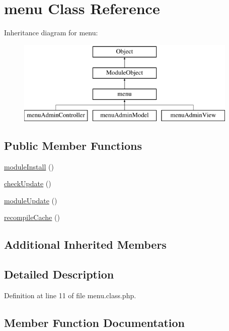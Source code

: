 \hypertarget{classmenu}{}\section{menu Class Reference}
\label{classmenu}
Inheritance diagram for menu\+:\begin{figure}[H]
\begin{center}
\leavevmode
\includegraphics[height=4.000000cm]{classmenu}
\end{center}
\end{figure}
\subsection*{Public Member Functions}
\begin{DoxyCompactItemize}
\item 
\hyperlink{classmenu_ae8c300e3fc86ad4a834e489d849c69e1}{module\+Install} ()
\item 
\hyperlink{classmenu_a42090ef27569489938b28486eec60922}{check\+Update} ()
\item 
\hyperlink{classmenu_aa9eb9adadde15b730b887564b9184023}{module\+Update} ()
\item 
\hyperlink{classmenu_a583aef0b15f6391d8e591f3498755f2e}{recompile\+Cache} ()
\end{DoxyCompactItemize}
\subsection*{Additional Inherited Members}


\subsection{Detailed Description}


Definition at line 11 of file menu.\+class.\+php.



\subsection{Member Function Documentation}
\mbox{\label{classmenu_a42090ef27569489938b28486eec60922}} 

